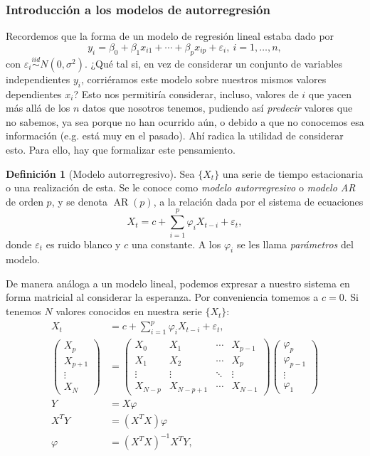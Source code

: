 \documentclass[11pt,letterpaper]{article}
\newcommand{\AR}{\ensuremath{\operatorname{AR}}}
\theoremstyle{definition}
\newtheorem{definition}{Definición}[section]
\theoremstyle{theorem}
\theoremstyle{remark}
\begin{document}
	\subsubsection{Introducción a los modelos de autorregresión}
	\noindent\justify Recordemos que la forma de un modelo de regresión lineal estaba dado por \[y_i=\beta_0+\beta_1x_{i1}+\cdots+\beta_px_{ip}+\varepsilon_i,\ i=1,\dots,n,\] con \(\varepsilon_i\overset{iid}{\sim}N(0,\sigma^2) \). ¿Qué tal si, en vez de considerar un conjunto de variables independientes \(y_i\), corriéramos este modelo sobre nuestros mismos valores dependientes \(x_i\)? Esto nos permitiría considerar, incluso, valores de \(i\) que yacen más allá de los \(n\) datos que nosotros tenemos, pudiendo así \textit{predecir} valores que no sabemos, ya sea porque no han ocurrido aún, o debido a que no conocemos esa información (e.g. está muy en el pasado). Ahí radica la utilidad de considerar esto. Para ello, hay que formalizar este pensamiento.
	\begin{definition}[Modelo autorregresivo]
		Sea \(\{X_t\}\) una serie de tiempo estacionaria o una realización de esta. Se le conoce como \textit{modelo autorregresivo} o \textit{modelo AR} de orden \(p\), y se denota \(\AR(p)\), a la relación dada por el sistema de ecuaciones
		\[X_t=c+\sum_{i=1}^{p}\varphi_iX_{t-i}+\varepsilon_t,\]
		donde \(\varepsilon_t\) es ruido blanco y \(c\) una constante. A los \(\varphi_i\) se les llama \textit{parámetros} del modelo. 
	\end{definition}
	De manera análoga a un modelo lineal, podemos expresar a nuestro sistema en forma matricial al considerar la esperanza. Por conveniencia tomemos a \(c=0\). Si tenemos \(N\) valores conocidos en nuestra serie \(\{X_t\}\):
	\begin{align*}
		X_t&=c+\sum_{i=1}^{p}\varphi_iX_{t-i}+\varepsilon_t, \\
		\begin{pmatrix}X_p\\X_{p+1}\\\vdots\\X_N\end{pmatrix}&=\begin{pmatrix}X_0&X_1&\cdots&X_{p-1}\\X_1&X_2&\cdots&X_p\\\vdots&\vdots&\ddots&\vdots\\X_{N-p}&X_{N-p+1}&\cdots&X_{N-1}\end{pmatrix}\begin{pmatrix}\varphi_p\\\varphi_{p-1}\\\vdots\\\varphi_1\end{pmatrix} \\
		Y&=X\varphi \\
		X^TY&=(X^TX)\varphi \\
		\varphi&=(X^TX)^{-1}X^TY,
	\end{align*}
\end{document}
